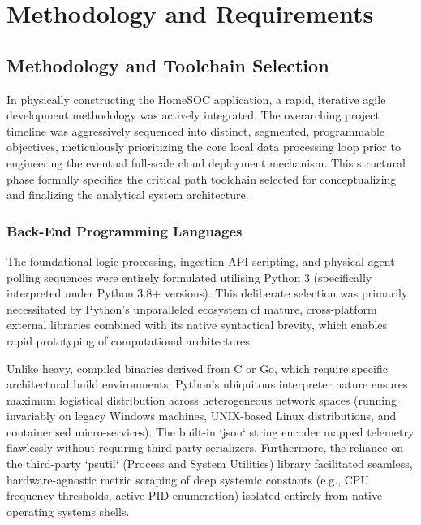 \chapter{Methodology and Requirements}

\section{Methodology and Toolchain Selection}
In physically constructing the HomeSOC application, a rapid, iterative agile development methodology was actively integrated. The overarching project timeline was aggressively sequenced into distinct, segmented, programmable objectives, meticulously prioritizing the core local data processing loop prior to engineering the eventual full-scale cloud deployment mechanism. This structural phase formally specifies the critical path toolchain selected for conceptualizing and finalizing the analytical system architecture.

\subsection{Back-End Programming Languages}
The foundational logic processing, ingestion API scripting, and physical agent polling sequences were entirely formulated utilising Python 3 (specifically interpreted under Python 3.8+ versions). This deliberate selection was primarily necessitated by Python's unparalleled ecosystem of mature, cross-platform external libraries combined with its native syntactical brevity, which enables rapid prototyping of computational architectures. 

Unlike heavy, compiled binaries derived from C or Go, which require specific architectural build environments, Python's ubiquitous interpreter nature ensures maximum logistical distribution across heterogeneous network spaces (running invariably on legacy Windows machines, UNIX-based Linux distributions, and containerised micro-services). The built-in `json` string encoder mapped telemetry flawlessly without requiring third-party serializers. Furthermore, the reliance on the third-party `psutil` (Process and System Utilities) library facilitated seamless, hardware-agnostic metric scraping of deep systemic constants (e.g., CPU frequency thresholds, active PID enumeration) isolated entirely from native operating systems shells.

